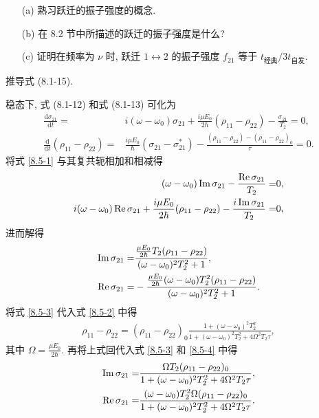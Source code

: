 \documentclass{note}
\begin{document}
\begin{exe}
    \begin{itemize}
        \item[(a)] 熟习跃迁的振子强度的概念.
        \item[(b)] 在 8.2 节中所描述的跃迁的振子强度是什么?
        \item[(c)] 证明在频率为 $\nu$ 时, 跃迁 $1\leftrightarrow 2$ 的振子强度 $f_{21}$ 等于 $t_{\text{经典}}/3t_{\text{自发}}$.
    \end{itemize}
\end{exe}
\begin{sol}
    
\end{sol}

\begin{exe}
    推导式 (8.1-15).
\end{exe}
\begin{pf}
    稳态下, 式 (8.1-12) 和式 (8.1-13) 可化为
    \begin{align}
        \label{8.5-1}
        \frac{\mathrm{d}\sigma_{21}}{\mathrm{d}t}=&i(\omega-\omega_0)\sigma_{21}+\frac{i\mu E_0}{2\hbar}(\rho_{11}-\rho_{22})-\frac{\sigma_{21}}{T_2}=0,\\
        \label{8.5-2}
        \frac{\mathrm{d}}{\mathrm{d}t}(\rho_{11}-\rho_{22})=&\frac{i\mu E_0}{\hbar}(\sigma_{21}-\sigma_{21}^*)-\frac{(\rho_{11}-\rho_{22})-(\rho_{11}-\rho_{22})_0}{\tau}=0.
    \end{align}
    将式 \eqref{8.5-1} 与其复共轭相加和相减得
    \begin{align}
        (\omega-\omega_0)\operatorname{Im}\sigma_{21}-\frac{\operatorname{Re}\sigma_{21}}{T_2}=&0,\\
        i(\omega-\omega_0)\operatorname{Re}\sigma_{21}+\frac{i\mu E_0}{2\hbar}(\rho_{11}-\rho_{22})-\frac{i\operatorname{Im}\sigma_{21}}{T_2}=&0,
    \end{align}
    进而解得
    \begin{align}
        \label{8.5-3}
        \operatorname{Im}\sigma_{21}=&\frac{\frac{\mu E_0}{2\hbar}T_2(\rho_{11}-\rho_{22})}{(\omega-\omega_0)^2T_2^2+1},\\
        \label{8.5-4}
        \operatorname{Re}\sigma_{21}=&-\frac{\frac{\mu E_0}{2\hbar}(\omega-\omega_0)T_2^2(\rho_{11}-\rho_{22})}{(\omega-\omega_0)^2T_2^2+1}.
    \end{align}
    将式 \eqref{8.5-3} 代入式 \eqref{8.5-2} 中得
    \begin{align}
        \rho_{11}-\rho_{22}=(\rho_{11}-\rho_{22})_0\frac{1+(\omega-\omega_0)^2T_2^2}{1+(\omega-\omega_0)^2T_2^2+4\Omega^2T_2\tau},
    \end{align}
    其中 $\Omega=\frac{\mu E_0}{2\hbar}$.
    再将上式回代入式 \eqref{8.5-3} 和 \eqref{8.5-4} 中得
    \begin{align}
        \operatorname{Im}\sigma_{21}=&\frac{\Omega T_2(\rho_{11}-\rho_{22})_0}{1+(\omega-\omega_0)^2T_2^2+4\Omega^2T_2\tau},\\
        \operatorname{Re}\sigma_{21}=&\frac{(\omega-\omega_0)T_2^2\Omega(\rho_{11}-\rho_{22})_0}{1+(\omega-\omega_0)^2T_2^2+4\Omega^2T_2\tau}.
    \end{align}
\end{pf}
\end{document}
